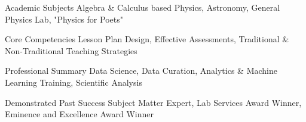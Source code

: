 

\begin{cvskills}

  \cvskill
    {Academic Subjects} %
    {Algebra \& Calculus based Physics, Astronomy, General Physics Lab, "Physics for Poets"} %

  \cvskill
    {Core Competencies} %
    {Lesson Plan Design, Effective Assessments, Traditional \& Non-Traditional Teaching Strategies} %

  \cvskill
    {Professional Summary} %
    {Data Science, Data Curation, Analytics \& Machine Learning Training, Scientific Analysis} %

  \cvskill
    {Demonstrated Past Success} %
    {Subject Matter Expert, Lab Services Award Winner, Eminence and Excellence Award Winner} %

\end{cvskills}

